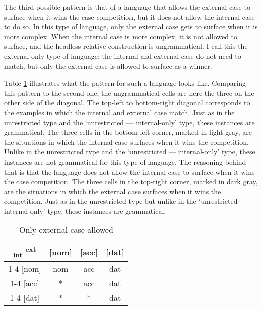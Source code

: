 The third possible pattern is that of a language that allows the external case to surface when it wins the case competition, but it does not allow the internal case to do so. In this type of language, only the external case gets to surface when it is more complex. When the internal case is more complex, it is not allowed to surface, and the headless relative construction is ungrammatical. I call this the external-only type of language: the internal and external case do not need to match, but only the external case is allowed to surface as a winner.

Table \ref{tbl:case-competition-only-ext} illustrates what the pattern for such a language looks like. Comparing this pattern to the second one, the ungrammatical cells are here the three on the other side of the diagonal.
The top-left to bottom-right diagonal corresponds to the examples in which the internal and external case match. Just as in the unrestricted type and the `unrestricted --- internal-only' type, these instances are grammatical.
The three cells in the bottom-left corner, marked in light gray, are the situations in which the internal case surfaces when it wins the competition. Unlike in the unrestricted type and the `unrestricted --- internal-only' type, these instances are not grammatical for this type of language. The reasoning behind that is that the language does not allow the internal case to surface when it wins the case competition.
The three cells in the top-right corner, marked in dark gray, are the situations in which the external case surfaces when it wins the competition. Just as in the unrestricted type but unlike in the `unrestricted --- internal-only' type, these instances are grammatical.

\begin{table}[ht]
  \center
  \caption{Only external case allowed}
  \begin{tabular}{c|c|c|c}
    \toprule
    \textsubscript{\ac{int}} \textsuperscript{\ac{ext}}
           & [\ac{nom}]
           & [\ac{acc}]
           & [\ac{dat}]
           \\ \cmidrule{1-4}
       [\ac{nom}]
           & \ac{nom}
           & \cellcolor{DG}\ac{acc}
           & \cellcolor{DG}\ac{dat}
           \\ \cmidrule{1-4}
       [\ac{acc}]
           & \cellcolor{LG}*
           & \ac{acc}
           & \cellcolor{DG}\ac{dat}
           \\ \cmidrule{1-4}
       [\ac{dat}]
           & \cellcolor{LG}*
           & \cellcolor{LG}*
           & \ac{dat}
           \\
     \bottomrule
  \end{tabular}
    \label{tbl:case-competition-only-ext}
\end{table}


